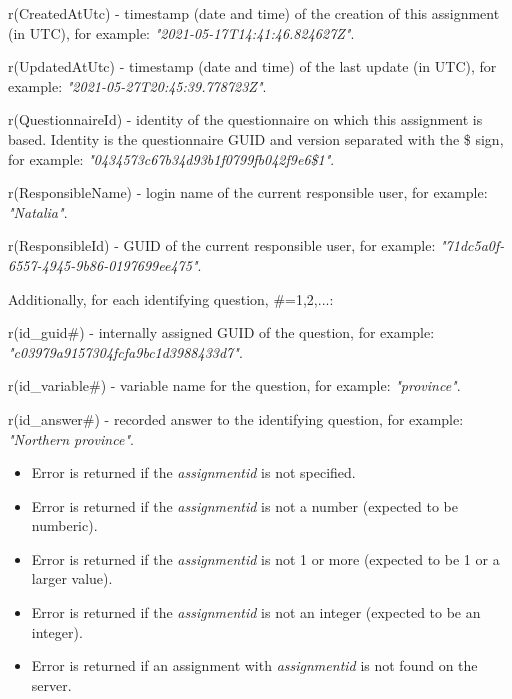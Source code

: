 \savedres
\begin{compactitem}
    \item r(CreatedAtUtc) - timestamp (date and time) of the creation of this
    assignment (in UTC), for example: \textit{"2021-05-17T14:41:46.824627Z"}.
    \item r(UpdatedAtUtc) - timestamp (date and time) of the last update (in
    UTC), for example: \textit{"2021-05-27T20:45:39.778723Z"}.
    \item r(QuestionnaireId)  - identity of the questionnaire on which this
    assignment is based. Identity is the questionnaire GUID and version
    separated with the \$ sign, for example: \newline
    \textit{"0434573c67b34d93b1f0799fb042f9e6\$1"}.
    \item r(ResponsibleName) - login name of the current responsible user,
    for example: \textit{"Natalia"}.
    \item r(ResponsibleId) - GUID of the current responsible user, for example:
    \textit{"71dc5a0f-6557-4945-9b86-0197699ee475"}.
\end{compactitem}

\vskip16pt
Additionally, for each identifying question, \#=1,2,...:
\begin{compactitem}
    \item r(id\_guid\#) - internally assigned GUID of the question,
    for example: \newline \textit{"c03979a9157304fcfa9bc1d3988433d7"}.
    \item r(id\_variable\#) - variable name for the question,
    for example: \textit{"province"}.
    \item r(id\_answer\#) - recorded answer to the identifying question,
    for example: \textit{"Northern province"}.
\end{compactitem}

\errheader
\begin{itemize}
    \item Error  is returned if the \textit{assignmentid} is not specified.
    \item Error  is returned if the \textit{assignmentid} is not a number (expected to be numberic).
    \item Error  is returned if the \textit{assignmentid} is not 1 or more (expected to be 1 or a larger value).
    \item Error  is returned if the \textit{assignmentid} is not an integer (expected to be an integer).
    \item Error  is returned if an assignment with \textit{assignmentid} is not found on the server.
\end{itemize}


